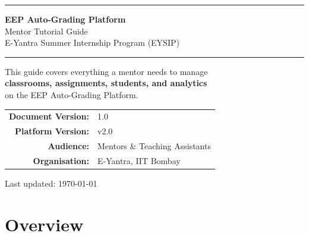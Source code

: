 \documentclass[12pt,a4paper]{article}
\begin{document}

\begin{titlepage}
  \centering
  \vspace*{2cm}

  {\color{mentorPurple}\rule{\linewidth}{3pt}}
  \vspace{0.5cm}

  {\Huge\bfseries\color{mentorPurple} EEP Auto-Grading Platform}\\[0.6em]
  {\LARGE\color{mentorAccent} Mentor Tutorial Guide}\\[0.4em]
  {\large\color{darkgray} E-Yantra Summer Internship Program (EYSIP)}

  \vspace{0.5cm}
  {\color{mentorPurple}\rule{\linewidth}{3pt}}

  \vspace{1.5cm}

  \begin{tcolorbox}[colback=lightgray, colframe=mentorAccent, width=0.85\linewidth]
    \centering
    \large This guide covers everything a mentor needs to manage\\
    \textbf{classrooms, assignments, students, and analytics}\\
    on the EEP Auto-Grading Platform.
  \end{tcolorbox}

  \vfill

  \begin{tabular}{rl}
    \textbf{Document Version:} & 1.0 \\
    \textbf{Platform Version:} & v2.0 \\
    \textbf{Audience:}         & Mentors \& Teaching Assistants \\
    \textbf{Organisation:}     & E-Yantra, IIT Bombay \\
  \end{tabular}

  \vspace{1cm}
  {\color{darkgray}\small Last updated: \today}
\end{titlepage}

\tableofcontents
\newpage

\section{Overview}
\end{document}
